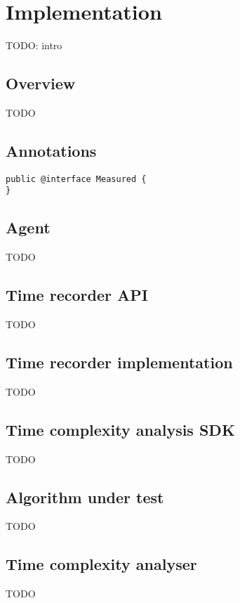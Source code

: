 \chapter{Implementation}

TODO: intro


\section{Overview}

TODO


\section{Annotations}
\begin{lstlisting}
public @interface Measured {
}
\end{lstlisting}

\section{Agent}

TODO


\section{Time recorder API}

TODO


\section{Time recorder implementation}

TODO


\section{Time complexity analysis SDK}

TODO


\section{Algorithm under test}

TODO


\section{Time complexity analyser}

TODO

